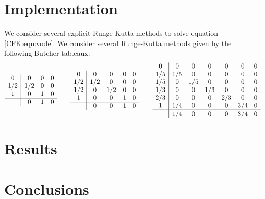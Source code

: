 \documentclass{csri19}
\begin{document}
\section{Implementation}\label{CFK:sec:implementation}
We consider several explicit Runge-Kutta methods to solve equation 
\ref{CFK:eqn:vode}. We consider several Runge-Kutta methods given by the 
following Butcher tableaux:
\[
 \begin{array}{c|ccc}
0   & 0   & 0 & 0\\
1/2 & 1/2 & 0 & 0\\
1   & 0   & 1 & 0\\
\hline
    & 0   & 1 & 0
\end{array}\qquad
\begin{array}{c|cccc}
0   & 0   & 0   & 0 & 0\\
1/2 & 1/2 & 0   & 0 & 0\\
1/2 & 0   & 1/2 & 0 & 0\\
1   & 0   & 0   & 1 & 0\\
\hline
    & 0   & 0   & 1 & 0
\end{array}\qquad
\begin{array}{c|cccccc}
0   & 0   & 0   & 0   & 0   & 0   & 0\\
1/5 & 1/5 & 0   & 0   & 0   & 0   & 0\\
1/5 & 0   & 1/5 & 0   & 0   & 0   & 0\\
1/3 & 0   & 0   & 1/3 & 0   & 0   & 0\\
2/3 & 0   & 0   & 0   & 2/3 & 0   & 0\\
1   & 1/4 & 0   & 0   & 0   & 3/4 & 0\\
\hline
    & 1/4 & 0   & 0   & 0   & 3/4 & 0
\end{array}
\]

\section{Results}\label{CFK:sec:results}

\section{Conclusions}




%
\end{document}

